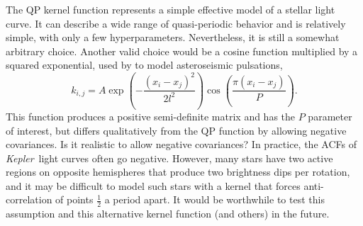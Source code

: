 \documentclass[a4paper,fleqn,usenatbib,useAMS]{mnras}
\newcommand{\Kepler}{{\it Kepler}}
\begin{document}
The QP kernel function represents a simple effective model of a stellar
light curve.
It can describe a wide range of quasi-periodic behavior and is
relatively simple, with only a few hyperparameters.
Nevertheless, it is still a somewhat arbitrary choice.
Another valid choice would be a cosine function multiplied by a
squared exponential, used by \citet{Brewer2009} to model asteroseismic
pulsations,
\begin{equation}
k_{i,j} = A \exp \left(-\frac{(x_i - x_j)^2}{2l^2}\right)
\cos\left(\frac{\pi(x_i - x_j)}{P}\right).
\end{equation}
\label{eq:cos_kernel}
This function produces a positive semi-definite matrix and has the $P$
parameter of interest, but differs qualitatively from the QP function
by allowing negative covariances.
Is it realistic to allow negative covariances?
In practice, the ACFs of \Kepler\ light curves often go negative.
However, many stars have two active regions on opposite hemispheres that
produce two brightness dips per rotation, and it
may be difficult to model such stars with a kernel that forces
anti-correlation of points $\frac{1}{2}$ a period apart.
It would be worthwhile to test this assumption and this alternative
kernel function (and others) in the future.
\end{document}
